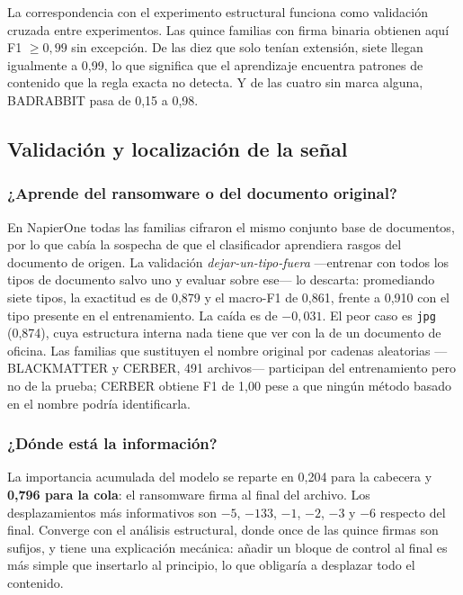 \documentclass[11pt,a4paper]{article}
\begin{document}
La correspondencia con el experimento estructural funciona como validación cruzada entre
experimentos. Las quince familias con firma binaria obtienen aquí F1 $\geq 0{,}99$ sin
excepción. De las diez que solo tenían extensión, siete llegan igualmente a 0,99, lo que
significa que el aprendizaje encuentra patrones de contenido que la regla exacta no detecta. Y
de las cuatro sin marca alguna, BADRABBIT pasa de 0,15 a 0,98.

\subsection{Validación y localización de la señal}

\subsubsection*{¿Aprende del ransomware o del documento original?}

En NapierOne todas las familias cifraron el mismo conjunto base de documentos, por lo que cabía
la sospecha de que el clasificador aprendiera rasgos del documento de origen. La validación
\emph{dejar-un-tipo-fuera} ---entrenar con todos los tipos de documento salvo uno y evaluar
sobre ese--- lo descarta: promediando siete tipos, la exactitud es de 0,879 y el macro-F1 de
0,861, frente a 0,910 con el tipo presente en el entrenamiento. La caída es de $-0{,}031$. El
peor caso es \texttt{jpg} (0,874), cuya estructura interna nada tiene que ver con la de un
documento de oficina. Las familias que sustituyen el nombre original por cadenas aleatorias
---BLACKMATTER y CERBER, 491 archivos--- participan del entrenamiento pero no de la prueba;
CERBER obtiene F1 de 1,00 pese a que ningún método basado en el nombre podría identificarla.

\subsubsection*{¿Dónde está la información?}

La importancia acumulada del modelo se reparte en 0,204 para la cabecera y \textbf{0,796 para
la cola}: el ransomware firma al final del archivo. Los desplazamientos más informativos son
$-5$, $-133$, $-1$, $-2$, $-3$ y $-6$ respecto del final. Converge con el análisis estructural,
donde once de las quince firmas son sufijos, y tiene una explicación mecánica: añadir un bloque
de control al final es más simple que insertarlo al principio, lo que obligaría a desplazar
todo el contenido.
\end{document}
